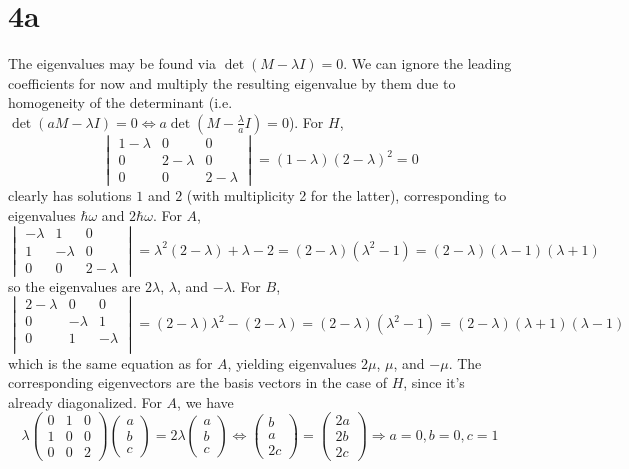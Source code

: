 \documentclass{article}
\begin{document}
\section*{4a}
The eigenvalues may be found via $\det(M-\lambda I)=0$.
We can ignore the leading coefficients for now and multiply the resulting eigenvalue by them due to homogeneity of the determinant
(i.e. $\det(aM-\lambda I)=0\Leftrightarrow a\det(M-\frac{\lambda}{a}I)=0$).
For $H$,
\[
  \begin{vmatrix}
    1-\lambda & 0 & 0 \\
    0 & 2-\lambda & 0 \\
    0 & 0 & 2-\lambda
  \end{vmatrix}
  =(1-\lambda)(2-\lambda)^{2}
  =0
\]
clearly has solutions $1$ and $2$ (with multiplicity 2 for the latter), corresponding to eigenvalues $\hbar\omega$ and $2\hbar\omega$.
For $A$,
\[
  \begin{vmatrix}
    -\lambda & 1 & 0 \\
    1 & -\lambda & 0 \\
    0 & 0 & 2-\lambda
  \end{vmatrix}
  =\lambda^{2}(2-\lambda)+\lambda-2
  =(2-\lambda)(\lambda^{2}-1)=(2-\lambda)(\lambda-1)(\lambda+1)
\]
so the eigenvalues are $2\lambda$, $\lambda$, and $-\lambda$.
For $B$,
\[
  \begin{vmatrix}
    2-\lambda & 0 & 0 \\
    0 & -\lambda & 1 \\
    0 & 1 & -\lambda \\
  \end{vmatrix}
  =(2-\lambda)\lambda^{2}-(2-\lambda)
  =(2-\lambda)(\lambda^{2}-1)
  =(2-\lambda)(\lambda+1)(\lambda-1)
\]
which is the same equation as for $A$, yielding eigenvalues $2\mu$, $\mu$, and $-\mu$.
The corresponding eigenvectors are the basis vectors in the case of $H$, since it's already diagonalized.
For $A$, we have
\[
  \lambda
  \begin{pmatrix}
    0 & 1 & 0 \\
    1 & 0 & 0 \\
    0 & 0 & 2
  \end{pmatrix}
  \begin{pmatrix}
    a \\
    b \\
    c
  \end{pmatrix}
  =2\lambda
  \begin{pmatrix}
    a \\
    b \\
    c
  \end{pmatrix}
  \Leftrightarrow
  \begin{pmatrix}
     b \\
     a \\
    2 c

  \end{pmatrix}
  =
  \begin{pmatrix}
    2a \\
    2b \\
    2c
  \end{pmatrix}
  \Rightarrow a=0, b=0, c=1
\]
\end{document}
